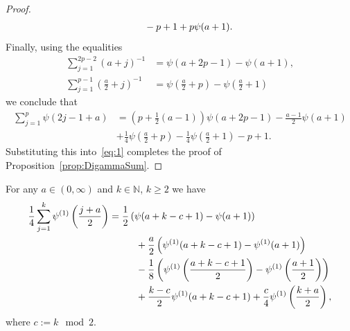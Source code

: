 \documentclass[AHL,Unicode,longabstracts,published]{cedram}
\newcommand{\N}{\mathbb{N}}
\begin{document}
\begin{proof}
\begin{align*}
&\mkern50mu -p+1+p\psi(a+1).
\end{align*}
Finally, using the equalities
\begin{align*}
\sum\limits_{j=1}^{2p-2}(a+j)^{-1}&=\psi(a+2p-1)-\psi(a+1),\\
\sum\limits_{j=1}^{p-1}\left(\frac{a}{2}+j\right)^{-1}&=\psi\left(\frac{a}{2}+p\right)-\psi\left(\frac{a}{2}+1\right)
\end{align*}
we conclude that
\begin{align*}
\sum\limits_{j=1}^p\psi(2j-1+a)&=\left(p+\frac{1}{2}(a-1)\right)\psi (a+2p-1)-\frac{a-1}{2}\psi(a+1)\\
&+\frac{1}{4}\psi\left(\frac{a}{2}+p\right)-\frac{1}{4}\psi\left(\frac{a}{2}+1\right)-p +1.
\end{align*}
Substituting this into~\eqref{eq:1} completes the proof of Proposition~\ref{prop:DigammaSum}.
\end{proof}


\begin{proposition}\label{prop:DerivativeDigammaSum}
For any $a\in(0,\infty)$ and $k\in\N$, $k\ge 2$ we have
\begin{align*}
\frac14\sum\limits_{j=1}^k\psi^{(1)}\left(\frac{j+a}{2}\right)&=\frac{1}{2}\left(\psi(a+k-c+1)-\psi(a+1)\right)\\
&\mkern50mu +\frac{a}{2}\left(\psi^{(1)}(a+k-c+1)-\psi^{(1)}(a+1)\right)\\
&\mkern50mu -\frac{1}{8}\left(\psi^{(1)}\left(\frac{a+k-c+1}{2}\right)-\psi^{(1)}\left(\frac{a+1}{2}\right)\right)\\
&\mkern50mu +\frac{k-c}{2}\psi^{(1)}(a+k-c+1)+\frac{c}{4}\psi^{(1)}\left(\frac{k+a}{2}\right),
\end{align*}
where $c:= k\mod 2$.
\end{proposition}
\end{document}
